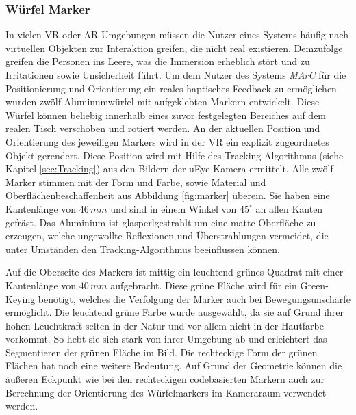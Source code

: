 \subsubsection{Würfel Marker}\label{sec:WürfelMarker} 

In vielen VR oder AR Umgebungen müssen die Nutzer eines Systems häufig nach virtuellen Objekten zur Interaktion greifen, die nicht real existieren. Demzufolge greifen die Personen ins Leere, was die Immersion erheblich stört und zu Irritationen sowie Unsicherheit führt.
Um dem Nutzer des Systems \textit{MArC} für die Positionierung und Orientierung ein reales haptisches Feedback zu ermöglichen wurden zwölf Aluminumwürfel mit aufgeklebten Markern entwickelt. Diese Würfel können beliebig innerhalb eines zuvor festgelegten Bereiches auf dem realen Tisch verschoben und rotiert werden. An der aktuellen Position und Orientierung des jeweiligen Markers wird in der VR ein explizit zugeordnetes Objekt gerendert. Diese Position wird mit Hilfe des Tracking-Algorithmus (siehe Kapitel \ref{sec:Tracking}) aus den Bildern der uEye Kamera ermittelt.
Alle zwölf Marker stimmen mit der Form und Farbe, sowie Material und Oberflächenbeschaffenheit aus Abbildung \ref{fig:marker} überein. Sie haben eine Kantenlänge von $46\,mm$ und sind in einem Winkel von $45^\circ$ an allen Kanten gefräst. Das Aluminium ist glasperlgestrahlt um eine matte Oberfläche zu erzeugen, welche ungewollte Reflexionen und Überstrahlungen vermeidet, die unter Umständen den Tracking-Algorithmus beeinflussen können. 

Auf die Oberseite des Markers ist mittig ein leuchtend grünes Quadrat mit einer Kantenlänge von $40\,mm$ aufgebracht. Diese grüne Fläche wird für ein Green-Keying benötigt, welches die Verfolgung der Marker auch bei Bewegungsunschärfe ermöglicht. Die leuchtend grüne Farbe wurde ausgewählt, da sie auf Grund ihrer hohen Leuchtkraft selten in der Natur und vor allem nicht in der Hautfarbe vorkommt. So hebt sie sich stark von ihrer Umgebung ab und erleichtert das Segmentieren der grünen Fläche im Bild. Die rechteckige Form der grünen Flächen hat noch eine weitere Bedeutung. Auf Grund der Geometrie können die äußeren Eckpunkt wie bei den rechteckigen codebasierten Markern auch zur Berechnung der Orientierung des Würfelmarkers im Kameraraum verwendet werden.

